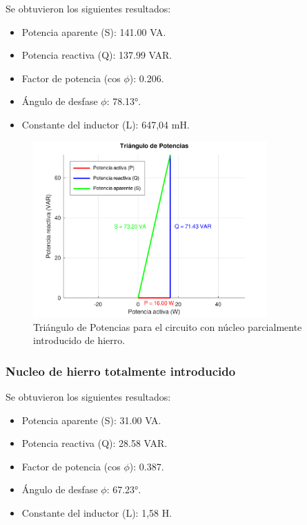 \documentclass{article}
\begin{document}
            Se obtuvieron los siguientes resultados:
            \begin{itemize}
                \item Potencia aparente (S): 141.00 VA.
                \item Potencia reactiva (Q): 137.99 VAR.
                \item Factor de potencia (cos $\phi$): 0.206.
                \item Ángulo de desfase $\phi$: 78.13°.
                \item Constante del inductor (L): 647,04 mH.
            \end{itemize}

            \begin{figure}[H]
                \centering
                \includegraphics[width=0.8\textwidth]{graficoParcialHierro.png}
                \caption{Triángulo de Potencias para el circuito con núcleo parcialmente introducido de hierro.}
                \label{fig:graficoParcialHierro}
            \end{figure}


        \subsubsection{Nucleo de hierro totalmente introducido}

            Se obtuvieron los siguientes resultados:
            \begin{itemize}
                \item Potencia aparente (S): 31.00 VA.
                \item Potencia reactiva (Q): 28.58 VAR.
                \item Factor de potencia (cos $\phi$): 0.387.
                \item Ángulo de desfase $\phi$: 67.23°.
                \item Constante del inductor (L): 1,58 H.
            \end{itemize}
\end{document}
